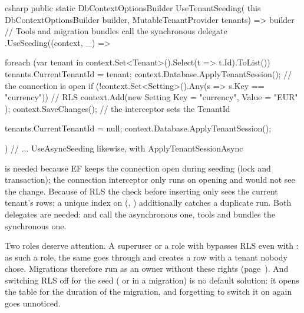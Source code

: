 \begin{sourcecode}{csharp}
public static DbContextOptionsBuilder UseTenantSeeding(
    this DbContextOptionsBuilder builder, MutableTenantProvider tenants)
    => builder
        // Tools and migration bundles call the synchronous delegate
        .UseSeeding((context, _) =>
        {
            foreach (var tenant in context.Set<Tenant>().Select(t => t.Id).ToList())
            {
                tenants.CurrentTenantId = tenant;
                context.Database.ApplyTenantSession();   // the connection is open
                if (!context.Set<Setting>().Any(s => s.Key == "currency"))   // RLS
                {
                    context.Add(new Setting { Key = "currency", Value = "EUR" });
                    context.SaveChanges();      // the interceptor sets the TenantId
                }
            }

            tenants.CurrentTenantId = null;
            context.Database.ApplyTenantSession();
        })
        // ... UseAsyncSeeding likewise, with ApplyTenantSessionAsync
\end{sourcecode}

 is needed because EF keeps the connection open
during seeding (lock and transaction); the connection interceptor only runs on opening and would
not see the change. Because of RLS the check before inserting only sees the current tenant's rows;
a unique index on (, ) additionally catches a duplicate run.
Both delegates are needed:  and
 call the asynchronous one, tools and bundles the synchronous one.

Two roles deserve attention. A superuser or a role with  bypasses RLS even with
: as such a role, the same  goes through and creates a row
with a tenant nobody chose. Migrations therefore run as an owner without these rights
(page~\pageref{sec:deployment}). And switching RLS off for the seed ( or
 in a migration) is no default solution: it opens the table for the duration of the
migration, and forgetting to switch it on again goes unnoticed.

